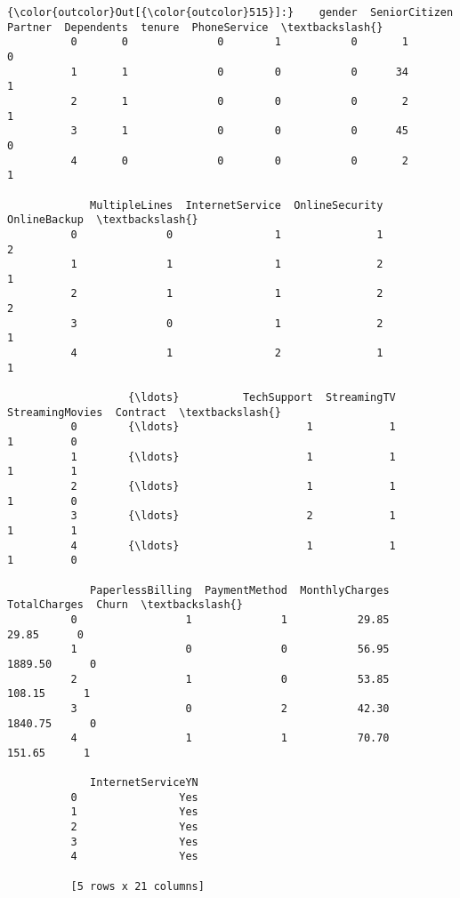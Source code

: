 \documentclass[11pt]{article}
\begin{document}
\begin{Verbatim}[commandchars=\\\{\}]
{\color{outcolor}Out[{\color{outcolor}515}]:}    gender  SeniorCitizen  Partner  Dependents  tenure  PhoneService  \textbackslash{}
          0       0              0        1           0       1             0   
          1       1              0        0           0      34             1   
          2       1              0        0           0       2             1   
          3       1              0        0           0      45             0   
          4       0              0        0           0       2             1   
          
             MultipleLines  InternetService  OnlineSecurity  OnlineBackup  \textbackslash{}
          0              0                1               1             2   
          1              1                1               2             1   
          2              1                1               2             2   
          3              0                1               2             1   
          4              1                2               1             1   
          
                   {\ldots}          TechSupport  StreamingTV  StreamingMovies  Contract  \textbackslash{}
          0        {\ldots}                    1            1                1         0   
          1        {\ldots}                    1            1                1         1   
          2        {\ldots}                    1            1                1         0   
          3        {\ldots}                    2            1                1         1   
          4        {\ldots}                    1            1                1         0   
          
             PaperlessBilling  PaymentMethod  MonthlyCharges  TotalCharges  Churn  \textbackslash{}
          0                 1              1           29.85         29.85      0   
          1                 0              0           56.95       1889.50      0   
          2                 1              0           53.85        108.15      1   
          3                 0              2           42.30       1840.75      0   
          4                 1              1           70.70        151.65      1   
          
             InternetServiceYN  
          0                Yes  
          1                Yes  
          2                Yes  
          3                Yes  
          4                Yes  
          
          [5 rows x 21 columns]
\end{Verbatim}
            
\end{document}
